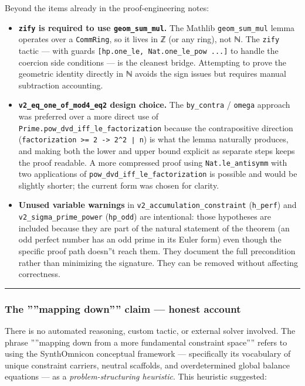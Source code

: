 \documentclass[11pt,a4paper]{article}
\begin{document}
Beyond the items already in the proof-engineering notes:

\begin{itemize}
    \item \textbf{\texttt{zify} is required to use \texttt{geom\_sum\_mul}.} The Mathlib \texttt{geom\_sum\_mul} lemma operates
over a \texttt{CommRing}, so it lives in ℤ (or any ring), not ℕ. The \texttt{zify} tactic --- with guards
\texttt{{[}hp.one\_le, Nat.one\_le\_pow ...{]}} to handle the coercion side conditions --- is the cleanest
bridge. Attempting to prove the geometric identity directly in ℕ avoids the sign issues but
requires manual subtraction accounting.
    \item \textbf{\texttt{v2\_eq\_one\_of\_mod4\_eq2} design choice.} The \texttt{by\_contra} / \texttt{omega} approach was preferred
over a more direct use of \texttt{Prime.pow\_dvd\_iff\_le\_factorization} because the contrapositive
direction (\texttt{factorization \textgreater{}= 2 -\textgreater{} 2\^{}2 ∣ n}) is what the lemma naturally produces, and making
both the lower and upper bound explicit as separate steps keeps the proof readable. A more
compressed proof using \texttt{Nat.le\_antisymm} with two applications of
\texttt{pow\_dvd\_iff\_le\_factorization} is possible and would be slightly shorter; the current form
was chosen for clarity.
    \item \textbf{Unused variable warnings} in \texttt{v2\_accumulation\_constraint} (\texttt{h\_perf}) and
\texttt{v2\_sigma\_prime\_power} (\texttt{hp\_odd}) are intentional: those hypotheses are included because
they are part of the natural statement of the theorem (an odd perfect number has an odd prime
in its Euler form) even though the specific proof path doesn''t reach them. They document
the full precondition rather than minimizing the signature. They can be removed without
affecting correctness.
\end{itemize}

\begin{center}
\rule{0.5\textwidth}{0.4pt}
\end{center}

\subsubsection{The ''''mapping down'''' claim --- honest account}

There is no automated reasoning, custom tactic, or external solver involved. The phrase
''''mapping down from a more fundamental constraint space'''' refers to using the SynthOmnicon
conceptual framework --- specifically its vocabulary of unique constraint carriers, neutral
scaffolds, and overdetermined global balance equations --- as a \emph{problem-structuring heuristic}.
This heuristic suggested:
\end{document}
